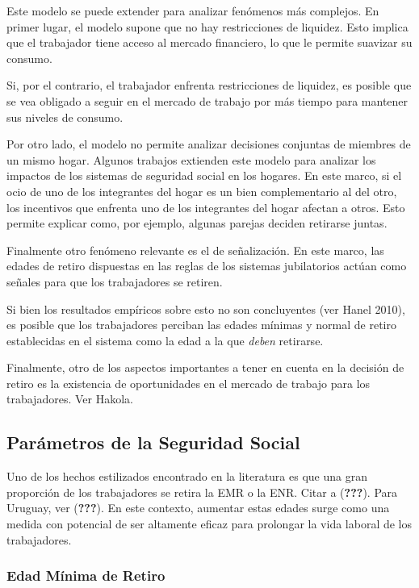 \documentclass[]{article}
\begin{document}
Este modelo se puede extender para analizar fenómenos más complejos. En
primer lugar, el modelo supone que no hay restricciones de liquidez.
Esto implica que el trabajador tiene acceso al mercado financiero, lo
que le permite suavizar su consumo.

Si, por el contrario, el trabajador enfrenta restricciones de liquidez,
es posible que se vea obligado a seguir en el mercado de trabajo por más
tiempo para mantener sus niveles de consumo.

Por otro lado, el modelo no permite analizar decisiones conjuntas de
miembres de un mismo hogar. Algunos trabajos extienden este modelo para
analizar los impactos de los sistemas de seguridad social en los
hogares. En este marco, si el ocio de uno de los integrantes del hogar
es un bien complementario al del otro, los incentivos que enfrenta uno
de los integrantes del hogar afectan a otros. Esto permite explicar
como, por ejemplo, algunas parejas deciden retirarse juntas.

Finalmente otro fenómeno relevante es el de señalización. En este marco,
las edades de retiro dispuestas en las reglas de los sistemas
jubilatorios actúan como señales para que los trabajadores se retiren.

Si bien los resultados empíricos sobre esto no son concluyentes (ver
Hanel 2010), es posible que los trabajadores perciban las edades mínimas
y normal de retiro establecidas en el sistema como la edad a la que
\emph{deben} retirarse.

Finalmente, otro de los aspectos importantes a tener en cuenta en la
decisión de retiro es la existencia de oportunidades en el mercado de
trabajo para los trabajadores. Ver Hakola.

\hypertarget{paruxe1metros-de-la-seguridad-social}{%
\subsection{Parámetros de la Seguridad
Social}\label{paruxe1metros-de-la-seguridad-social}}

Uno de los hechos estilizados encontrado en la literatura es que una
gran proporción de los trabajadores se retira la EMR o la ENR. Citar a
({\textbf{???}}). Para Uruguay, ver ({\textbf{???}}). En este contexto,
aumentar estas edades surge como una medida con potencial de ser
altamente eficaz para prolongar la vida laboral de los trabajadores.

\hypertarget{edad-muxednima-de-retiro}{%
\subsubsection{Edad Mínima de Retiro}\label{edad-muxednima-de-retiro}}
\end{document}
